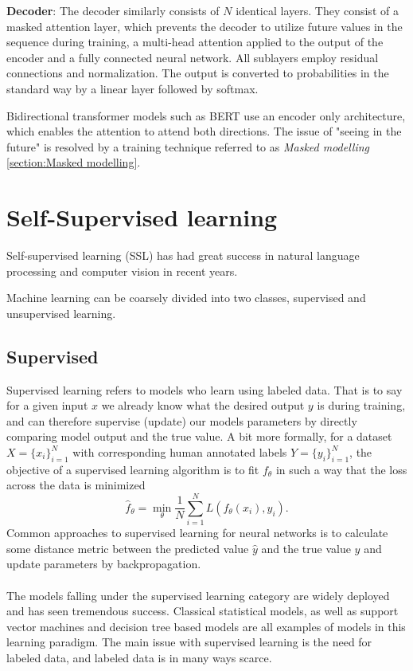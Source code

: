 \documentclass[../../thesis.tex]{subfiles}
\begin{document}
\textbf{Decoder}: The decoder similarly consists of $N$ identical layers. They consist of a masked attention layer, which prevents the decoder to utilize future values in the sequence during training, a multi-head attention applied to the output of the encoder and a fully connected neural network. All sublayers employ residual connections and normalization. The output is converted to probabilities in the standard way by a linear layer followed by softmax. 
\newline

Bidirectional transformer models such as BERT \cite{devlin2019bert} use an encoder only architecture, which enables the attention to attend both directions. The issue of "seeing in the future" is resolved by a training technique referred to as \textit{Masked modelling} \ref{section:Masked modelling}.

\section{Self-Supervised learning}

Self-supervised learning (SSL) has had great success in natural language processing and computer vision in recent years. 

Machine learning can be coarsely divided into two classes, supervised and unsupervised learning. 

\subsection{Supervised}
Supervised learning refers to models who learn using labeled data. That is to say for a given input $x$ we already know what the desired output $y$ is during training, and can therefore supervise (update) our models parameters by directly comparing model output and the true value. A bit more formally, for a dataset $X = \{x_i\}_{i=1}^N$ with corresponding human annotated labels $Y = \{y_i\}_{i=1}^N$, the objective of a supervised learning algorithm is to fit $f_\theta$ in such a way that the loss across the data is minimized
\begin{equation}
    \widehat{f}_\theta = \min_\theta \frac{1}{N} \sum_{i=1}^N L(f_\theta(x_i),y_i).
\end{equation}
Common approaches to supervised learning for neural networks is to calculate some distance metric between the predicted value $\widehat{y}$ and the true value $y$ and update parameters by backpropagation.\\\\
The models falling under the supervised learning category are widely deployed and has seen tremendous success. Classical statistical models, as well as support vector machines and decision tree based models are all examples of models in this learning paradigm. The main issue with supervised learning is the need for labeled data, and labeled data is in many ways scarce.
\end{document}
